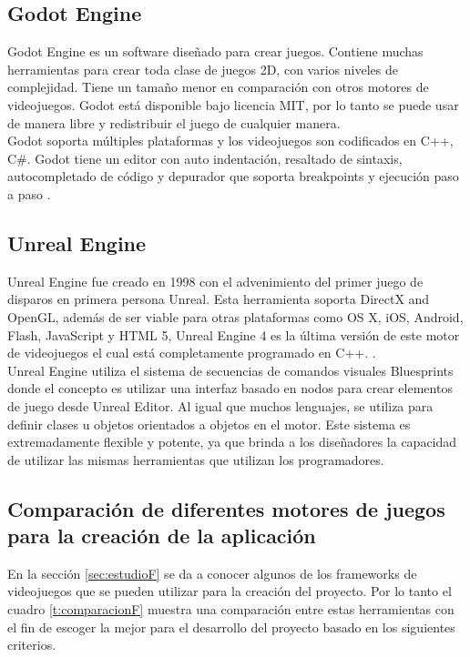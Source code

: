 \documentclass[a4paper, openright, 12pt]{report}
\begin{document}
\subsection*{Godot Engine}
\justify
Godot Engine es un software diseñado para crear juegos. Contiene muchas herramientas para crear toda clase de juegos 2D, con varios niveles de complejidad. Tiene un tamaño menor en comparación con otros motores de videojuegos. Godot está disponible bajo licencia MIT, por lo tanto se puede usar de manera libre y redistribuir el juego de cualquier manera.\\
Godot soporta múltiples plataformas y los videojuegos son codificados en C++, C\#. Godot tiene un editor con auto indentación, resaltado
de sintaxis, autocompletado de código y depurador que soporta breakpoints y ejecución paso a paso \cite{manzur2018godot}.

\subsection*{Unreal Engine}
\justify
Unreal Engine fue creado en 1998 con el advenimiento del primer juego de disparos en primera persona Unreal. Esta herramienta soporta DirectX and OpenGL, además de ser viable para otras plataformas como OS X, iOS, Android, Flash, JavaScript y HTML 5, Unreal Engine 4 es la última versión de este motor de videojuegos el cual está completamente programado en C++. \cite{sanders2016introduction}.\\
Unreal Engine utiliza el sistema de secuencias de comandos visuales Bluesprints donde el concepto es utilizar una interfaz basado en nodos para crear elementos de juego desde Unreal Editor. Al igual que muchos lenguajes, se utiliza para definir clases u objetos orientados a objetos en el motor. Este sistema es extremadamente flexible y potente, ya que brinda a los diseñadores la capacidad de utilizar las mismas herramientas que utilizan los programadores.  
\cite{unreal2020}

\subsection{Comparación de diferentes motores de juegos para la creación de la aplicación}
\justify
En la sección \ref{sec:estudioF} se da a conocer algunos de los frameworks de videojuegos que se pueden utilizar para la creación del proyecto. Por lo tanto el cuadro \ref{t:comparacionF} muestra una comparación entre estas herramientas con el fin de escoger la mejor para el desarrollo del proyecto basado en los siguientes criterios.
\end{document}
